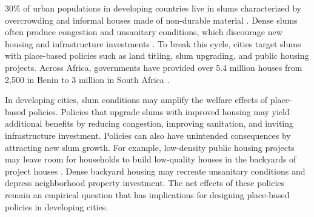\documentclass[12pt]{article}
\begin{document}
30\% of urban populations in developing countries live in slums characterized by overcrowding and informal houses made of non-durable material \citep{mdg}.  Dense slums often produce congestion and unsanitary conditions, which discourage new housing and infrastructure investments \citep{marx2013slums}.  To break this cycle, cities target slums with place-based policies such as land titling, slum upgrading, and public housing projects.  Across Africa, governments have provided over 5.4 million houses from 2,500 in Benin to 3 million in South Africa \citep{bah2018housing}.  



In developing cities, slum conditions may amplify the welfare effects of place-based policies.  Policies that upgrade slums with improved housing may yield additional benefits by reducing congestion, improving sanitation, and inviting infrastructure investment.  Policies can also have unintended consequences by attracting new slum growth.  For example, low-density public housing projects may leave room for households to build low-quality houses in the backyards of project houses \citep{Brueckner2018backyarding}.  Dense backyard housing may recreate unsanitary conditions and depress neighborhood property investment.  The net effects of these policies remain an empirical question that has implications for designing place-based policies in developing cities.
\end{document}
